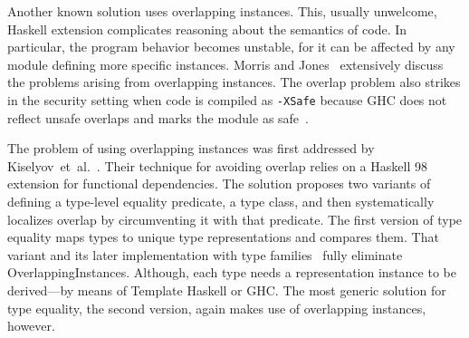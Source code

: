 \documentclass[runningheads]{llncs}
\newcommand{\K}[1]{\lstinline{#1}}
\begin{document}
Another known solution uses overlapping instances. This, usually unwelcome, Haskell extension complicates reasoning about the semantics of code. In particular, the program behavior becomes unstable, for it can be affected by any module defining more specific instances. Morris and Jones~\cite{Morris2010} extensively discuss the problems arising from overlapping instances.
The overlap problem also strikes in the security setting when code is compiled as \K{-XSafe} because GHC does not reflect unsafe overlaps and marks the module as safe~\cite{sh-overlapping}.

The problem of using overlapping instances was first addressed by Kiselyov~et~al.~\cite{Kiselyov2004}. Their technique for avoiding overlap relies on a Haskell 98 extension for functional dependencies. The solution proposes two variants of defining a type-level equality predicate, a type class, and then systematically localizes overlap by circumventing it with that predicate. The first version of type equality maps types to unique type representations and compares them. That variant and its later implementation with type families~\cite{Kiselyov2012} fully eliminate \textsf{OverlappingInstances}. Although, each type needs a representation instance to be derived---by means of Template Haskell or GHC. The most generic solution for type equality, the second version, again makes use of overlapping instances, however.
\end{document}
